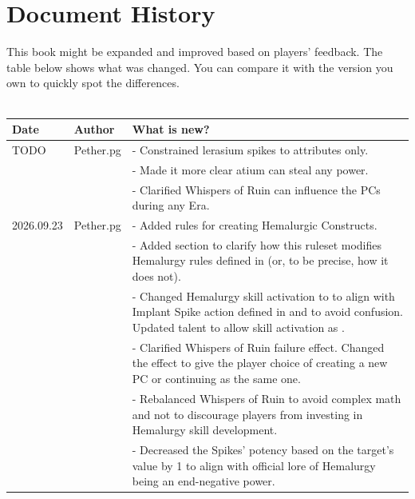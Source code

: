 \onecolumn
\section{Document History}

This book might be expanded and improved based on players' feedback. The table below shows what was changed. You can compare it with the version you own to quickly spot the differences. \\ \\

\noindent
\begin{tabular}{p{2cm} p{2cm} p{12cm}}
	Date & Author & What is new? \\ \hline	
	
	\color{black} TODO
	& \color{black} Pether.pg
	& \color{black} - Constrained lerasium spikes to attributes only. \\
	
	&& - Made it more clear atium can steal any power. \\
	
	&& - Clarified Whispers of Ruin can influence the PCs during any Era. \\
	
	\color{black} 2026.09.23
	& \color{black} Pether.pg
	& \color{black} - Added rules for creating Hemalurgic Constructs. \\
	
	&& - Added section to clarify how this ruleset modifies Hemalurgy rules defined in \handbookMistborn{} (or, to be precise, how it does not).\\
	
	&& - Changed Hemalurgy skill activation to \iconActionTriple{} to align with Implant Spike action defined in \handbookMistborn{} and to avoid confusion. Updated \talentMeleeHemalurgyName{} talent to allow skill activation as \iconAction{}. \\	
	
	&& - Clarified Whispers of Ruin failure effect. Changed the effect to give the player choice of creating a new PC or continuing as the same one. \\
	
	&& - Rebalanced Whispers of Ruin to avoid complex math and not to discourage players from investing in Hemalurgy skill development. \\
	
	&& - Decreased the Spikes' potency based on the target's value by 1 to align with official lore of Hemalurgy being an end-negative power.  \\
	

\end{tabular}
